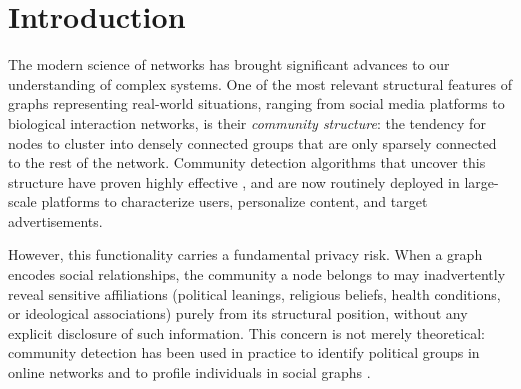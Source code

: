 \documentclass[11pt,a4paper,twoside]{tesis}
\begin{document}
\def\autor{Dante Culaciati}
\def\tituloTesis{Improving Community Membership Hiding \vspace{.2cm} \\
                 via Deep Reinforcement Learning}
\def\runtitulo{Mejorando el Ocultamiento de Membres\'ia de Comunidades
               mediante Aprendizaje Profundo por Refuerzo}
\def\runtitle{Improving Community Membership Hiding via Deep Reinforcement Learning}
\def\director{Esteban Feuerstein}
\def\codirector{[Nombre del Codirector]}   %
\def\lugar{Buenos Aires, 2026}


\frontmatter
\pagestyle{empty}


\cleardoublepage


\cleardoublepage


\cleardoublepage


\cleardoublepage
\tableofcontents

\mainmatter
\pagestyle{headings}


\chapter{Introduction}
\label{ch:intro}

The modern science of networks has brought significant advances to our understanding of
complex systems. One of the most relevant structural features of graphs representing
real-world situations, ranging from social media platforms to biological interaction
networks, is their \emph{community structure}: the tendency for nodes to cluster into
densely connected groups that are only sparsely connected to the rest of the network.
Community detection algorithms that uncover this structure have proven highly effective
\cite{Fortunato-2010}, and are now routinely deployed in large-scale platforms to
characterize users, personalize content, and target advertisements.

However, this functionality carries a fundamental privacy risk. When a graph encodes
social relationships, the community a node belongs to may inadvertently reveal sensitive
affiliations (political leanings, religious beliefs, health conditions, or ideological
associations) purely from its structural position, without any explicit disclosure of
such information. This concern is not merely theoretical: community detection has been
used in practice to identify political groups in online networks
\cite{narayanan2009deanonymizing} and to profile individuals in social graphs
\cite{Fire2014privacynetworks}.
\end{document}
